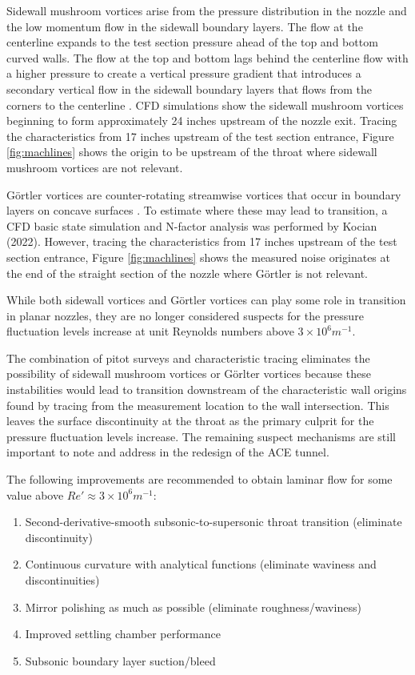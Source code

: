 Sidewall mushroom vortices arise from the pressure distribution in the nozzle and the low momentum flow in the sidewall boundary layers. The flow at the centerline expands to the test section pressure ahead of the top and bottom curved walls. The flow at the top and bottom lags behind the centerline flow with a higher pressure to create a vertical pressure gradient that introduces a secondary vertical flow in the sidewall boundary layers that flows from the corners to the centerline \cite{sabnis}. CFD simulations show the sidewall mushroom vortices beginning to form approximately 24 inches upstream of the nozzle exit. Tracing the characteristics from 17 inches upstream of the test section entrance, Figure \ref{fig:machlines} shows the origin to be upstream of the throat where sidewall mushroom vortices are not relevant.

Görtler vortices are counter-rotating streamwise vortices that occur in boundary layers on concave surfaces \cite{saric}. To estimate where these may lead to transition, a CFD basic state simulation and N-factor analysis was performed by Kocian (2022). However, tracing the characteristics from 17 inches upstream of the test section entrance, Figure \ref{fig:machlines} shows the measured noise originates at the end of the straight section of the nozzle where Görtler is not relevant.

While both sidewall vortices and Görtler vortices can play some role in transition in planar nozzles, they are no longer considered suspects for the pressure fluctuation levels increase at unit Reynolds numbers above $3 \times 10^6 m^{-1}$.

The combination of pitot surveys and characteristic tracing eliminates the possibility of sidewall mushroom vortices or Görlter vortices because these instabilities would lead to transition downstream of the characteristic wall origins found by tracing from the measurement location to the wall intersection. This leaves the surface discontinuity at the throat as the primary culprit for the pressure fluctuation levels increase. The remaining suspect mechanisms are still important to note and address in the redesign of the ACE tunnel.

The following improvements are recommended to obtain laminar flow for some value above $Re' \approx 3 \times 10^6 m^{-1}$:
\begin{enumerate}
    \item Second-derivative-smooth subsonic-to-supersonic throat transition (eliminate discontinuity)
    \item Continuous curvature with analytical functions (eliminate waviness and discontinuities)
    \item Mirror polishing as much as possible (eliminate roughness/waviness)
    \item Improved settling chamber performance
    \item Subsonic boundary layer suction/bleed
\end{enumerate}

